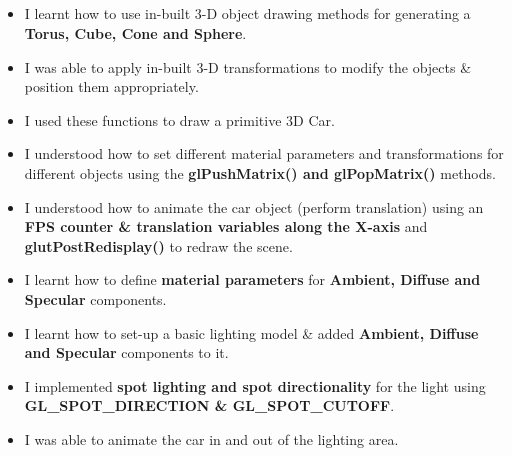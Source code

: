 \documentclass[12pt, a4]{article}
\begin{document}
\subsection*{}
\begin{itemize}
\item I learnt how to use in-built 3-D object drawing methods for generating a \textbf{Torus, Cube, Cone and Sphere}.
\item I was able to apply in-built 3-D transformations to modify the objects \& position them appropriately.
\item I used these functions to draw a primitive 3D Car.
\item I understood how to set different material parameters and transformations for different objects using the \textbf{glPushMatrix() and glPopMatrix()} methods.
\item I understood how to animate the car object (perform translation) using an \textbf{FPS counter \& translation variables along the X-axis} and \textbf{glutPostRedisplay()} to redraw the scene.
\item I learnt how to define \textbf{material parameters} for \textbf{Ambient, Diffuse and Specular} components.
\item I learnt how to set-up a basic lighting model \& added \textbf{Ambient, Diffuse and Specular} components to it.
\item I implemented \textbf{spot lighting and spot directionality} for the light using \newline \textbf{GL\_SPOT\_DIRECTION \& GL\_SPOT\_CUTOFF}.
\item I was able to animate the car in and out of the lighting area.
\end{itemize}
\end{document}
